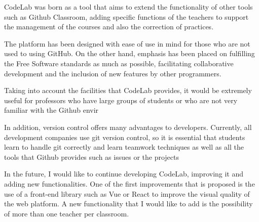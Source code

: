 

CodeLab was born as a tool that aims to extend the functionality of other tools such as Github Classroom, adding specific functions of the teachers to support the management of the courses and also the correction of practices.

The platform has been designed with ease of use in mind for those who are not used to using GitHub. On the other hand, emphasis has been placed on fulfilling the Free Software standards as much as possible,
facilitating collaborative development and the inclusion of new features by other programmers.

Taking into account the facilities that CodeLab provides, it would be extremely useful for professors who have large groups of students or who are not very familiar with the Github envir

In addition, version control offers many advantages to developers. Currently, all development companies use git version control, so it is essential that students learn to handle git correctly and learn teamwork techniques as well as all the tools that Github provides such as issues or the projects

In the future, I would like to continue developing CodeLab, improving it and adding new functionalities. One of the first improvements that is proposed is the use of a front-end library such as Vue or React to improve the visual quality of the web platform. A new functionality that I would like to add is the possibility of more than one teacher per classroom.